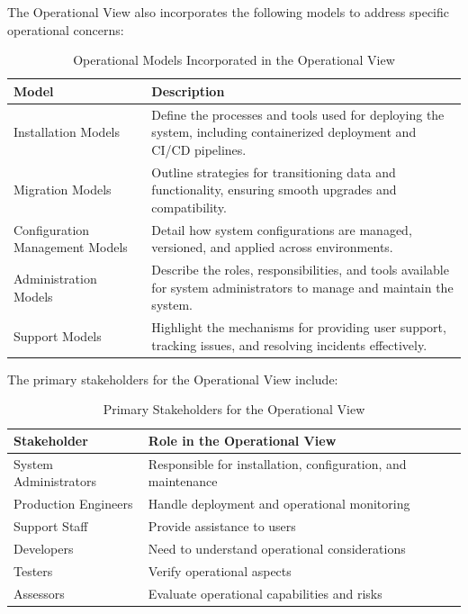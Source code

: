 The Operational View also incorporates the following models to address specific operational concerns:
\begin{table}[H]
    \centering
    \caption{Operational Models Incorporated in the Operational View}
    \label{tab:operational_models}
    \begin{tabular}{|p{}|p{}|}
        \hline
        \textbf{Model}                     & \textbf{Description}                                                                 \\ \hline
        Installation Models                & Define the processes and tools used for deploying the system, including containerized deployment and CI/CD pipelines. \\ \hline
        Migration Models                   & Outline strategies for transitioning data and functionality, ensuring smooth upgrades and compatibility.               \\ \hline
        Configuration Management Models    & Detail how system configurations are managed, versioned, and applied across environments.                              \\ \hline
        Administration Models              & Describe the roles, responsibilities, and tools available for system administrators to manage and maintain the system. \\ \hline
        Support Models                     & Highlight the mechanisms for providing user support, tracking issues, and resolving incidents effectively.             \\ \hline
    \end{tabular}
\end{table}

The primary stakeholders for the Operational View include:
\begin{table}[H]
    \centering
    \caption{Primary Stakeholders for the Operational View}
    \label{tab:operational_view_stakeholders}
    \begin{tabular}{|p{}|p{}|}
        \hline
        \textbf{Stakeholder}  & \textbf{Role in the Operational View}                        \\ \hline
        System Administrators & Responsible for installation, configuration, and maintenance \\ \hline
        Production Engineers  & Handle deployment and operational monitoring                 \\ \hline
        Support Staff         & Provide assistance to users                                  \\ \hline
        Developers            & Need to understand operational considerations                \\ \hline
        Testers               & Verify operational aspects                                   \\ \hline
        Assessors             & Evaluate operational capabilities and risks                  \\ \hline
    \end{tabular}
\end{table}

